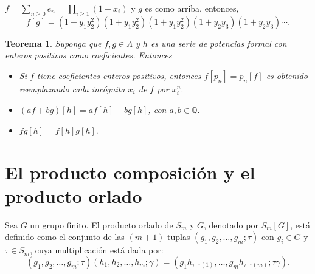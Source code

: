 \documentclass[12pt]{book}
\newtheorem{theorem}{Teorema}[section]
\theoremstyle{definition}
\newcounter{in}
\newcounter{ini}
\begin{document}
$f = \sum_{n \geq 0}e_n = \prod_{i \geq 1}(1 + x_{i})$ y $g$ es como
arriba, entonces,
\begin{equation}
  \label{eq:105}
  f \left [ g \right ] = (1 +y_{1}y_{2}^{2}) (1 +y_{1}y_{2}^{2}) (1 +y_{1}y_{2}^{2}) (1 +y_{2}y_{3}) (1 +y_{2}y_{3}) \cdots .
\end{equation}
\begin{theorem}
  \label{ple_pr}
  Suponga que $f, g \in \Lambda$ y $h$ es una serie de potencias
  formal con enteros positivos como coeficientes. Entonces
\begin{itemize}
\item Si $f$ tiene coeficientes enteros positivos, entonces
  $f \left [ p_{n} \right ] = p_{n} \left [ f \right ]$ es obtenido
  reemplazando cada incógnita $x_{i}$ de $f$ por $x_{i}^{n}.$
\item $(af + bg) \left [ h \right ] = af \left [ h \right ] + bg \left [ h \right ]$, con $a,b \in \mathbb{Q}.$
\item $fg \left [ h \right ] = f \left [ h \right ] g \left [ h \right ].$
\end{itemize} 
\end{theorem}
\section{El producto composición y el producto orlado}
\label{pr_or}
Sea $G$ un grupo finito. El producto orlado de $S_m$ y $G$, denotado
por $S_m\left [ G \right ]$, está definido como el conjunto de las
$(m+1)$ tuplas $(g_1,g_2, \ldots, g_m ; \tau)$ con $g_i \in G$ y
$\tau \in S_m$, cuya multiplicación está dada por: 
\begin{equation*}
(g_1,g_2, \ldots, g_m ; \tau)(h_1,h_2, \ldots, h_m ; \gamma) = (g_{1} h_{\tau^{-1}(1)}, \ldots, g_{m} h_{\tau^{-1}(m)}; \tau \gamma).
\end{equation*}
\end{document}
